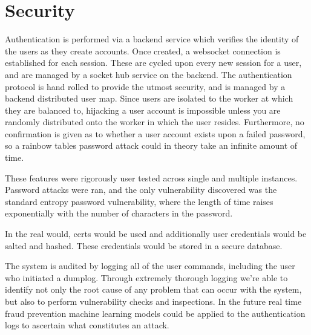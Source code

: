 \chapter{Security}
Authentication is performed via a backend service which verifies the identity of the users as they create accounts. Once created, a websocket connection is established for each session. These are cycled upon every new session for a user, and are managed by a socket hub service on the backend. The authentication protocol is hand rolled to provide the utmost security, and is managed by a backend distributed user map. Since users are isolated to the worker at which they are balanced to, hijacking a user account is impossible unless you are randomly distributed onto the worker in which the user resides. Furthermore, no confirmation is given as to whether a user account exists upon a failed password, so a rainbow tables password attack could in theory take an infinite amount of time.

These features were rigorously user tested across single and multiple instances. Password attacks were ran, and the only vulnerability discovered was the standard entropy password vulnerability, where the length of time raises exponentially with the number of characters in the password.

In the real would, certs would be used and additionally user credentials would be salted and hashed. These credentials would be stored in a secure database.

The system is audited by logging all of the user commands, including the user who initiated a dumplog. Through extremely thorough logging we're able to identify not only the root cause of any problem that can occur with the system, but also to perform vulnerability checks and inspections. In the future real time fraud prevention machine learning models could be applied to the authentication logs to ascertain what constitutes an attack.